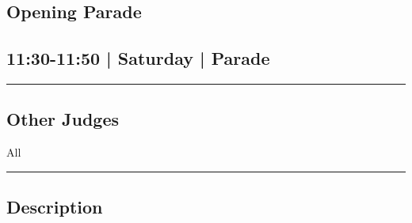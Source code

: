 \documentclass[10pt, A5]{article}
\begin{document}
	

		\begin{framed}
			\begin{minipage}{\textwidth}

			\setcounter{section}{22}
							\section{Opening Parade}
						
			\subsection*{11:30-11:50 | Saturday | Parade}

			\vspace{0.25cm}
			\hrule
			\vspace{0.25cm}


			\subsection*{Other Judges}
							All

					\vspace{0.25cm}
			\hrule
			\vspace{0.25cm}

			\begin{minipage}{\textwidth}
			\subsection*{\faListAlt \: Description}
			
			\end{minipage}


	\end{minipage}
	\end{framed}

	
\end{document}
